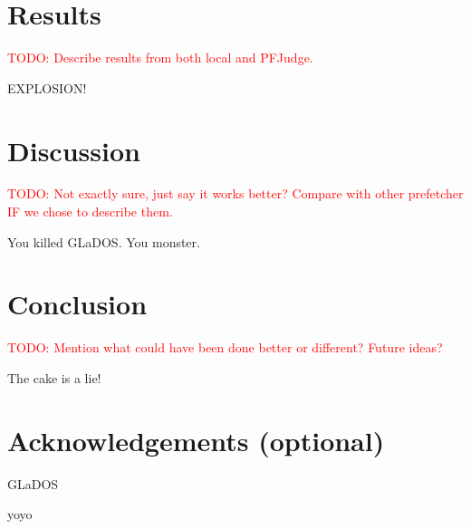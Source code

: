 \documentclass[a4paper]{IEEEtran}
\newcommand\TODO[1]{\textcolor{red}{TODO:#1}}
\newcommand\todo[1]{\TODO{#1}}
\begin{document}
\section{Results}

\todo{ Describe results from both local and PFJudge.}



EXPLOSION!

\section{Discussion}

\todo{ Not exactly sure, just say it works better? Compare with other prefetcher IF we chose to describe them. }

You killed GLaDOS.
You monster.

\section{Conclusion}

\todo{ Mention what could have been done better or different? Future ideas? }

The cake is a lie!

\section{Acknowledgements (optional)}

GLaDOS

yoyo \cite{assignment-text}



\nocite{*}
\end{document}
